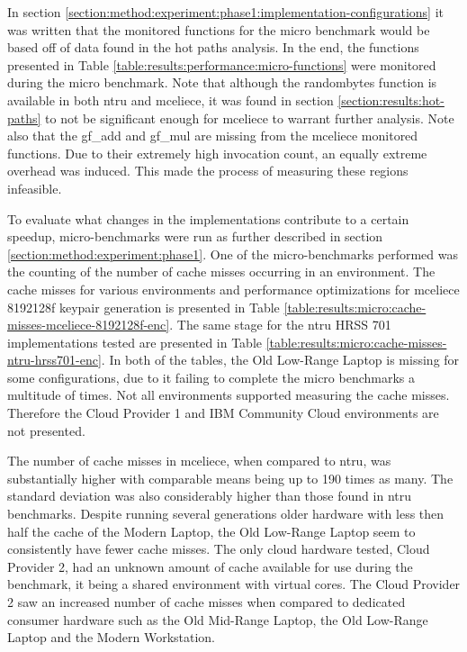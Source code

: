In section \ref{section:method:experiment:phase1:implementation-configurations} it was written that the monitored functions for the micro benchmark would be based off of data found in the hot paths analysis. In the end, the functions presented in Table \ref{table:results:performance:micro-functions} were monitored during the micro benchmark. Note that although the randombytes function is available in both \gls{ntru} and \gls{mceliece}, it was found in section \ref{section:results:hot-paths} to not be significant enough for \gls{mceliece} to warrant further analysis. Note also that the gf\_add and gf\_mul are missing from the \gls{mceliece} monitored functions. Due to their extremely high invocation count, an equally extreme overhead was induced. This made the process of measuring these regions infeasible.

To evaluate what changes in the implementations contribute to a certain speedup, micro-benchmarks were run as further described in section \ref{section:method:experiment:phase1}. One of the micro-benchmarks performed was the counting of the number of cache misses occurring in an environment. The cache misses for various environments and performance optimizations for \gls{mceliece} 8192128f keypair generation is presented in Table \ref{table:results:micro:cache-misses-mceliece-8192128f-enc}. The same stage for the \gls{ntru} HRSS 701 implementations tested are presented in Table \ref{table:results:micro:cache-misses-ntru-hrss701-enc}. In both of the tables, the Old Low-Range Laptop is missing for some configurations, due to it failing to complete the micro benchmarks a multitude of times. Not all environments supported measuring the cache misses. Therefore the Cloud Provider 1 and IBM Community Cloud environments are not presented.

The number of cache misses in \gls{mceliece}, when compared to \gls{ntru}, was substantially higher with comparable means being up to 190 times as many. The standard deviation was also considerably higher than those found in \gls{ntru} benchmarks. Despite running several generations older hardware with less then half the cache of the Modern Laptop, the Old Low-Range Laptop seem to consistently have fewer cache misses. The only cloud hardware tested, Cloud Provider 2, had an unknown amount of cache available for use during the benchmark, it being a shared environment with virtual cores. The Cloud Provider 2 saw an increased number of cache misses when compared to dedicated consumer hardware such as the Old Mid-Range Laptop, the Old Low-Range Laptop and the Modern Workstation.

